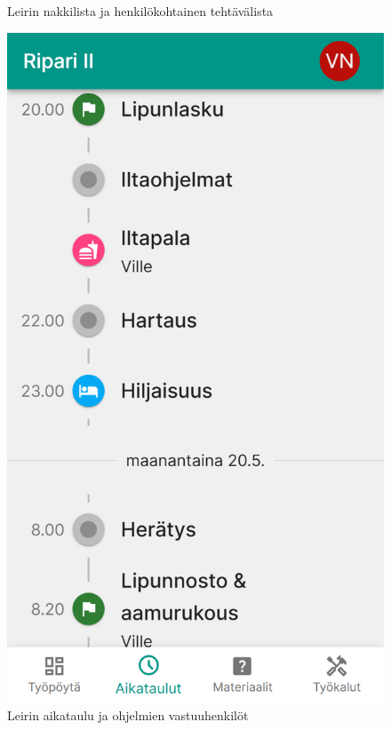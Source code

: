 \begin{figure}[h!]
\begin{minipage}[b]{.3\textwidth}
        \caption{Leirin nakkilista ja henkilökohtainen tehtävälista}
        \label{fig:isosapp-nakkilista}
    \end{minipage}\qquad
    \begin{minipage}[b]{.3\textwidth}
        \includegraphics[width=\textwidth]{figures/isosapp-aikataulu.png}
        \caption{Leirin aikataulu ja ohjelmien vastuuhenkilöt}
        \label{fig:isosapp-aikataulu}
    \end{minipage}
\end{figure}

